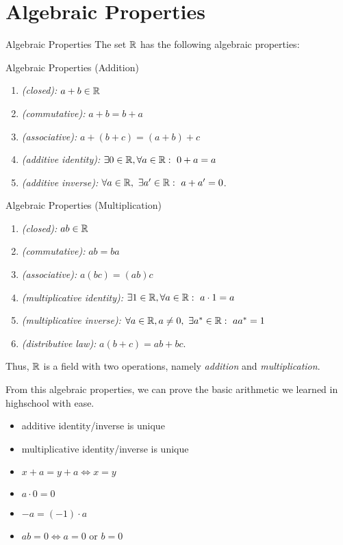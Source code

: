 \documentclass{beamer}
\begin{document}
\section{Algebraic Properties}
\begin{frame}{Algebraic Properties}
  The set $\R$ has the following algebraic properties:
  \begin{block}{Algebraic Properties (Addition)}
    \begin{enumerate}
      \item \textit{(closed):}
        $a+b\in\R$
      \item \textit{(commutative):}
        $a+b=b+a$
      \item \textit{(associative):}
        $a+(b+c)=(a+b)+c$
      \item \textit{(additive identity):}
        $\exists 0\in\R,\forall a\in\R:~ 0+a=a$
      \item \textit{(additive inverse):}
        $\forall a\in\R,~\exists a'\in\R:~ a+a'=0$.
    \end{enumerate}
  \end{block}
\end{frame}
\begin{frame}
  \begin{block}{Algebraic Properties (Multiplication)}
    \begin{enumerate}
      \item \textit{(closed):}
        $ab\in\R$
      \item \textit{(commutative):}
        $ab=ba$
      \item \textit{(associative):}
        $a(bc)=(ab)c$
      \item \textit{(multiplicative identity):}
        $\exists 1\in\R,\forall a\in\R:~ a\cdot 1=a$
      \item \textit{(multiplicative inverse):}
        $\forall a\in\R,a\neq 0,~\exists a^{*}\in\R:~ aa^{*}=1$
      \item \textit{(distributive law): }
        $a(b+c)=ab+bc$.
    \end{enumerate}
  \end{block}
  Thus, $\R$ is a field with two operations, namely 
  \textit{addition} and \textit{multiplication}.
\end{frame}
\begin{frame}
  From this algebraic properties, we can prove the basic arithmetic
  we learned in highschool with ease. 
  \begin{lemma}
    \begin{itemize}
      \item additive identity/inverse is unique
      \item multiplicative identity/inverse is unique
      \item $x+a=y+a \iff x=y$
      \item $a\cdot 0=0$
      \item $-a=(-1)\cdot a$
      \item $ab=0 \iff a=0\text{ or }b=0$
    \end{itemize}
  \end{lemma}
\end{frame}
\end{document}
